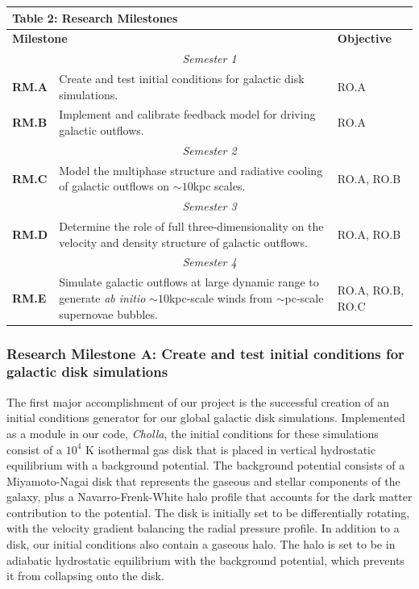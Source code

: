 \documentclass[11pt,letterpaper,english]{article}
\begin{document}
\begin{table}[h]
\vspace{-.12in}
\begin{tabular}{|l|p{4.6in}|l|} 
\multicolumn{3}{l}{\bf{Table 2: Research Milestones}}\\
\hline
\multicolumn{2}{|l|}{\bf Milestone} & {\bf Objective} \\ \hline
\multicolumn{3}{|c|}{\it Semester 1} \\ \hline
\textbf{RM.A} & Create and test initial conditions for galactic disk simulations. & RO.A \\ \hline
\textbf{RM.B} & Implement and calibrate feedback model for driving galactic outflows. & RO.A\\ \hline
\multicolumn{3}{|c|}{\it Semester 2} \\ \hline
\textbf{RM.C} & Model the multiphase structure and radiative cooling of galactic
outflows on $\sim10$kpc scales. & RO.A, RO.B \\ \hline
\multicolumn{3}{|c|}{\it Semester 3} \\ \hline
\textbf{RM.D} & Determine the role of full three-dimensionality on the velocity and density
structure of galactic outflows. & RO.A, RO.B\\ \hline
\multicolumn{3}{|c|}{\it Semester 4} \\ \hline
\textbf{RM.E} & Simulate galactic outflows at large dynamic range to generate {\it ab initio} $\sim10$kpc-scale winds from $\sim$pc-scale supernovae bubbles. & RO.A, RO.B, RO.C\\ 
\hline
\end{tabular}
\end{table}

\subsubsection{Research Milestone A: Create and test initial conditions for galactic disk simulations}

The first major accomplishment of our project is the successful creation of an initial conditions generator for our global galactic disk simulations. Implemented as a module in our code, \textit{Cholla}, the initial conditions for these simulations consist of a $10^4$ K isothermal gas disk that is placed in vertical hydrostatic equilibrium with a background potential. The background potential consists of a Miyamoto-Nagai disk that represents the gaseous and stellar components of the galaxy, plus a Navarro-Frenk-White halo profile that accounts for the dark matter contribution to the potential. The disk is initially set to be differentially rotating, with the velocity gradient balancing the radial pressure profile. In addition to a disk, our initial conditions also contain a gaseous halo. The halo is set to be in adiabatic hydrostatic equilibrium with the background potential, which prevents it from collapsing onto the disk.
\end{document}
